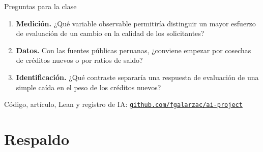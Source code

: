\documentclass[aspectratio=169,10pt,t]{beamer}
\begin{document}
\begin{frame}{Preguntas para la clase}
\vspace{4mm}
\begin{enumerate}\setlength{\itemsep}{5mm}\large
\item \textbf{Medición.} ¿Qué variable observable permitiría distinguir un mayor
esfuerzo de evaluación de un cambio en la calidad de los solicitantes?
\item \textbf{Datos.} Con las fuentes públicas peruanas, ¿conviene empezar por
cosechas de créditos nuevos o por ratios de saldo?
\item \textbf{Identificación.} ¿Qué contraste separaría una respuesta de evaluación de
una simple caída en el peso de los créditos nuevos?
\end{enumerate}
\vspace{7mm}
\begin{plainbox}\small
Código, artículo, Lean y registro de IA:
\href{https://github.com/fgalarzac/ai-project}{\color{navy}\texttt{github.com/fgalarzac/ai-project}}
\end{plainbox}
\end{frame}

\appendix
\section{Respaldo}
\end{document}
